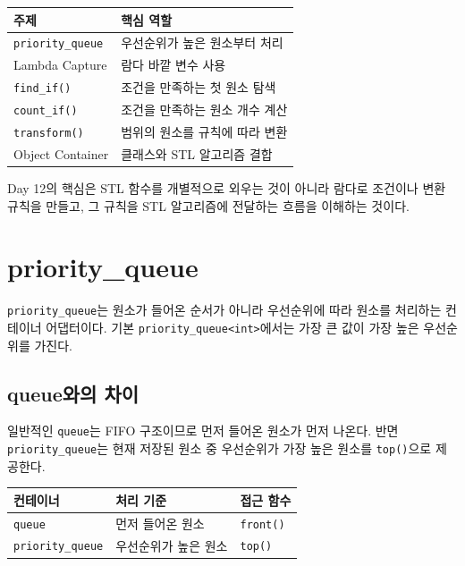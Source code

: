 \documentclass[11pt,a4paper]{article}
\begin{document}
\begin{center}
\begin{tabular}{ll}
\toprule
주제 & 핵심 역할 \\
\midrule
\texttt{priority\_queue} & 우선순위가 높은 원소부터 처리 \\
Lambda Capture & 람다 바깥 변수 사용 \\
\texttt{find\_if()} & 조건을 만족하는 첫 원소 탐색 \\
\texttt{count\_if()} & 조건을 만족하는 원소 개수 계산 \\
\texttt{transform()} & 범위의 원소를 규칙에 따라 변환 \\
Object Container & 클래스와 STL 알고리즘 결합 \\
\bottomrule
\end{tabular}
\end{center}

\begin{importantbox}
Day 12의 핵심은 STL 함수를 개별적으로 외우는 것이 아니라 람다로 조건이나 변환 규칙을 만들고,
그 규칙을 STL 알고리즘에 전달하는 흐름을 이해하는 것이다.
\end{importantbox}

\section{priority\_queue}
\texttt{priority\_queue}는 원소가 들어온 순서가 아니라 우선순위에 따라 원소를 처리하는 컨테이너 어댑터이다.
기본 \texttt{priority\_queue<int>}에서는 가장 큰 값이 가장 높은 우선순위를 가진다.

\subsection{queue와의 차이}
일반적인 \texttt{queue}는 FIFO 구조이므로 먼저 들어온 원소가 먼저 나온다.
반면 \texttt{priority\_queue}는 현재 저장된 원소 중 우선순위가 가장 높은 원소를 \texttt{top()}으로 제공한다.

\begin{center}
\begin{tabular}{lll}
\toprule
컨테이너 & 처리 기준 & 접근 함수 \\
\midrule
\texttt{queue} & 먼저 들어온 원소 & \texttt{front()} \\
\texttt{priority\_queue} & 우선순위가 높은 원소 & \texttt{top()} \\
\bottomrule
\end{tabular}
\end{center}
\end{document}
